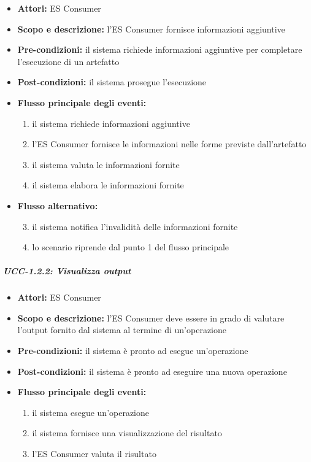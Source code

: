 \begin{itemize}
	\item \textbf{Attori:} ES Consumer
	\item \textbf{Scopo e descrizione:} l'ES Consumer fornisce informazioni aggiuntive 
	\item \textbf{Pre-condizioni:} il sistema richiede informazioni aggiuntive per completare l'esecuzione di un artefatto
	\item \textbf{Post-condizioni:} il sistema prosegue l'esecuzione
	\item \textbf{Flusso principale degli eventi:}
		\begin{enumerate}
			\item il sistema richiede informazioni aggiuntive
			\item l'ES Consumer fornisce le informazioni nelle forme previste dall'artefatto
			\item il sistema valuta le informazioni fornite
			\item il sistema elabora le informazioni fornite
		\end{enumerate}
	\item \textbf{Flusso alternativo:} 
		\begin{enumerate}
			\setcounter{enumi}{2}
			\item il sistema notifica l'invalidità delle informazioni fornite
			\item lo scenario riprende dal punto 1 del flusso principale
		\end{enumerate}
\end{itemize}


\subparagraph{UCC-1.2.2: Visualizza output}

\begin{itemize}
	\item \textbf{Attori:} ES Consumer
	\item \textbf{Scopo e descrizione:} l'ES Consumer deve essere in grado di valutare l'output fornito dal sistema al termine di un'operazione
	\item \textbf{Pre-condizioni:} il sistema è pronto ad esegue un'operazione
	\item \textbf{Post-condizioni:} il sistema è pronto ad eseguire una nuova operazione
	\item \textbf{Flusso principale degli eventi:}
		\begin{enumerate}
			\item il sistema esegue un'operazione
			\item il sistema fornisce una visualizzazione del risultato
			\item l'ES Consumer valuta il risultato
		\end{enumerate}
\end{itemize}


